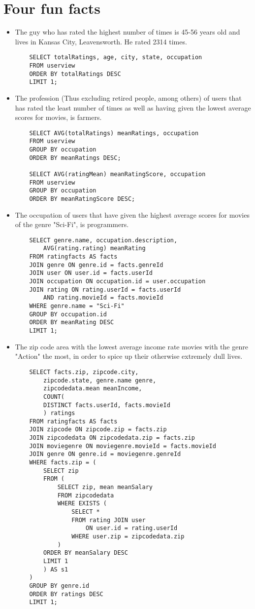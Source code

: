 \section*{Four fun facts}
\begin{itemize}
	\item The guy who has rated the highest number of times is 45-56 years old and lives in Kansas City, Leavensworth. He rated 2314 times. 
		\begin{lstlisting} 
	SELECT totalRatings, age, city, state, occupation 
	FROM userview
	ORDER BY totalRatings DESC
	LIMIT 1; 
		\end{lstlisting}
	\item The profession (Thus excluding retired people, among others) of users that has rated the least number of times as well as having given the lowest average scores for movies, is farmers. 
		\begin{lstlisting} 
	SELECT AVG(totalRatings) meanRatings, occupation
	FROM userview
	GROUP BY occupation
	ORDER BY meanRatings DESC;

	SELECT AVG(ratingMean) meanRatingScore, occupation
	FROM userview
	GROUP BY occupation
	ORDER BY meanRatingScore DESC;
		\end{lstlisting}
	\item The occupation of users that have given the highest average scores for movies of the genre "Sci-Fi", is programmers. 
		\begin{lstlisting} 
	SELECT genre.name, occupation.description, 
		AVG(rating.rating) meanRating
	FROM ratingfacts AS facts
	JOIN genre ON genre.id = facts.genreId
	JOIN user ON user.id = facts.userId
	JOIN occupation ON occupation.id = user.occupation
	JOIN rating ON rating.userId = facts.userId 
		AND rating.movieId = facts.movieId
	WHERE genre.name = "Sci-Fi"
	GROUP BY occupation.id
	ORDER BY meanRating DESC
	LIMIT 1;
		\end{lstlisting}
	\item The zip code area with the lowest average income rate movies with the genre "Action" the most, in order to spice up their otherwise extremely dull lives. 
		\begin{lstlisting} 
	SELECT facts.zip, zipcode.city, 
		zipcode.state, genre.name genre, 
		zipcodedata.mean meanIncome,
		COUNT(
		DISTINCT facts.userId, facts.movieId
		) ratings
	FROM ratingfacts AS facts
	JOIN zipcode ON zipcode.zip = facts.zip
	JOIN zipcodedata ON zipcodedata.zip = facts.zip
	JOIN moviegenre ON moviegenre.movieId = facts.movieId
	JOIN genre ON genre.id = moviegenre.genreId
	WHERE facts.zip = (
		SELECT zip 
		FROM (
			SELECT zip, mean meanSalary
			FROM zipcodedata
	        WHERE EXISTS (
	        	SELECT * 
	        	FROM rating JOIN user 
	        		ON user.id = rating.userId 
	        	WHERE user.zip = zipcodedata.zip
	        )
		ORDER BY meanSalary DESC
		LIMIT 1
		) AS s1
	)
	GROUP BY genre.id
	ORDER BY ratings DESC
	LIMIT 1;
		\end{lstlisting}
\end{itemize}